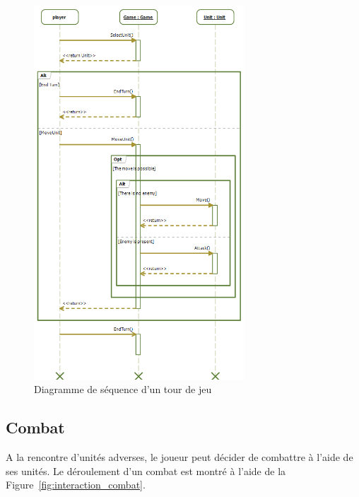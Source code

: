 \documentclass[a4paper]{article}
\begin{document}
\begin{figure}[ht]
\centering
	\includegraphics[width=0.7\textwidth]{../Schemas/sequence_Tour.png}
		\caption{Diagramme de séquence d'un tour de jeu}
		\label{fig:sequence_tour}
\end{figure}

\clearpage
	\subsection{Combat}
 A la rencontre d'unités adverses, le joueur peut décider de combattre à l'aide de ses unités. Le déroulement d'un combat est montré à l'aide de la Figure~\ref{fig:interaction_combat}.
\end{document}
